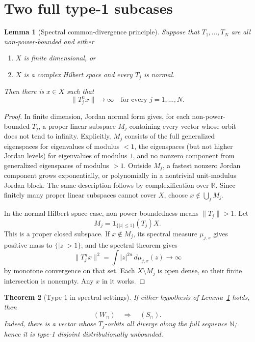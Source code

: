 \documentclass[11pt]{article}
\newtheorem{theorem}{Theorem}
\newtheorem{lemma}[theorem]{Lemma}
\newcommand{\N}{\mathbb N}
\begin{document}
\section{Two full type-1 subcases}

\begin{lemma}[Spectral common-divergence principle]\label{lem:spectral}
Suppose that $T_1,\ldots,T_N$ are all non-power-bounded and either
\begin{enumerate}
\item $X$ is finite dimensional, or
\item $X$ is a complex Hilbert space and every $T_j$ is normal.
\end{enumerate}
Then there is $x\in X$ such that
\[
 \|T_j^nx\|\longrightarrow\infty
 \quad\text{for every }j=1,\ldots,N.
\]
\end{lemma}

\begin{proof}
In finite dimension, Jordan normal form gives, for each non-power-bounded
$T_j$, a proper linear subspace $M_j$ containing every vector whose orbit
does not tend to infinity.  Explicitly, $M_j$ consists of the full
generalized eigenspaces for eigenvalues of modulus $<1$, the eigenspaces (but
not higher Jordan levels) for eigenvalues of modulus $1$, and no nonzero
component from generalized eigenspaces of modulus $>1$.  Outside $M_j$, a
fastest nonzero Jordan component grows exponentially, or polynomially in a
nontrivial unit-modulus Jordan block.  The same description follows by
complexification over $\mathbb R$.  Since finitely many proper linear
subspaces cannot cover $X$, choose $x\notin\bigcup_jM_j$.

In the normal Hilbert-space case, non-power-boundedness means
$\|T_j\|>1$.  Let
\[
 M_j=\mathbf1_{\{|z|\leq1\}}(T_j)X.
\]
This is a proper closed subspace.  If $x\notin M_j$, its spectral measure
$\mu_{j,x}$ gives positive mass to $\{|z|>1\}$, and the spectral theorem
gives
\[
 \|T_j^nx\|^2=\int |z|^{2n}\,d\mu_{j,x}(z)\longrightarrow\infty
\]
by monotone convergence on that set.  Each $X\setminus M_j$ is open dense,
so their finite intersection is nonempty.  Any $x$ in it works.
\end{proof}

\begin{theorem}[Type 1 in spectral settings]\label{thm:type1}
If either hypothesis of Lemma~\ref{lem:spectral} holds, then
\[
 (W_\cap)\quad\Longrightarrow\quad(S_\cap).
\]
Indeed, there is a vector whose $T_j$-orbits all diverge along the full
sequence $\N$; hence it is type-1 disjoint distributionally unbounded.
\end{theorem}
\end{document}
